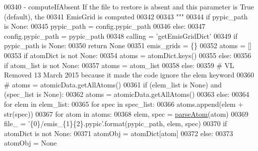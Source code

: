 \begin{DoxyCode}
00340 \textcolor{stringliteral}{        - computeIfAbsent   If the file to restore is absent and this parameter is True (default), the }
00341 \textcolor{stringliteral}{                            EmisGrid is computed}
00342 \textcolor{stringliteral}{            }
00343 \textcolor{stringliteral}{    """}
00344     \textcolor{keywordflow}{if} pypic\_path \textcolor{keywordflow}{is} \textcolor{keywordtype}{None}:
00345         pypic\_path = config.pypic\_path
00346     \textcolor{keywordflow}{else}:
00347         config.pypic\_path = pypic\_path
00348     calling = \textcolor{stringliteral}{'getEmisGridDict'}
00349     \textcolor{keywordflow}{if} pypic\_path \textcolor{keywordflow}{is} \textcolor{keywordtype}{None}:
00350         \textcolor{keywordflow}{return} \textcolor{keywordtype}{None}
00351     emis\_grids = \{\}
00352     atoms = []
00353     \textcolor{keywordflow}{if} atomDict \textcolor{keywordflow}{is} \textcolor{keywordflow}{not} \textcolor{keywordtype}{None}:
00354         atoms = atomDict.keys()
00355     \textcolor{keywordflow}{else}:
00356         \textcolor{keywordflow}{if} atom\_list \textcolor{keywordflow}{is} \textcolor{keywordflow}{not} \textcolor{keywordtype}{None}:
00357             atoms = atom\_list
00358         \textcolor{keywordflow}{else}:
00359 \textcolor{comment}{# VL Removed 13 March 2015 because it made the code ignore the elem keyword             }
00360 \textcolor{comment}{#            atoms = atomicData.getAllAtoms()}
00361             \textcolor{keywordflow}{if} (elem\_list \textcolor{keywordflow}{is} \textcolor{keywordtype}{None}) \textcolor{keywordflow}{and} (spec\_list \textcolor{keywordflow}{is} \textcolor{keywordtype}{None}):
00362                 atoms = atomicData.getAllAtoms()
00363             \textcolor{keywordflow}{else}:
00364                 \textcolor{keywordflow}{for} elem \textcolor{keywordflow}{in} elem\_list:
00365                     \textcolor{keywordflow}{for} spec \textcolor{keywordflow}{in} spec\_list:
00366                         atoms.append(elem + str(spec)) 
00367     \textcolor{keywordflow}{for} atom \textcolor{keywordflow}{in} atoms:
00368         elem, spec = \hyperlink{namespacepyneb_1_1utils_1_1misc_a2bb6f906a75f26a882093e9ce9272507}{parseAtom}(atom)
00369         file\_ = \textcolor{stringliteral}{'\{0\}/emis\_\{1\}\{2\}.pypic'}.format(pypic\_path, elem, spec)
00370         \textcolor{keywordflow}{if} atomDict \textcolor{keywordflow}{is} \textcolor{keywordflow}{not} \textcolor{keywordtype}{None}:
00371             atomObj = atomDict[atom]
00372         \textcolor{keywordflow}{else}:
00373             atomObj = \textcolor{keywordtype}{None}

\end{DoxyCode}
